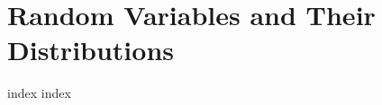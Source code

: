 \chapter{Random Variables and Their Distributions}
\label{ch:cp}
\ifdefined\HCode
\else
{
\startcontents[chapter]
}
\fi

{index}
{index}

\ifdefined\HCode
{}
\fi

\ifdefined\HCode
\else
{
\stopcontents[chapter]
}
\fi

\ifdefined\HCode
{}
\fi